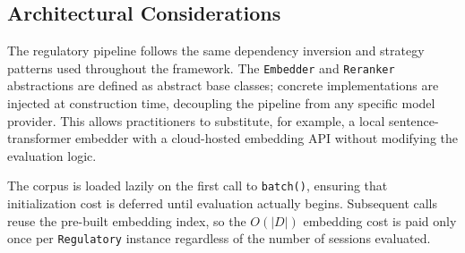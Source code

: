 \subsection{Architectural Considerations}

The regulatory pipeline follows the same dependency inversion and strategy patterns used throughout the framework. The \texttt{Embedder} and \texttt{Reranker} abstractions are defined as abstract base classes; concrete implementations are injected at construction time, decoupling the pipeline from any specific model provider. This allows practitioners to substitute, for example, a local sentence-transformer embedder with a cloud-hosted embedding API without modifying the evaluation logic.

The corpus is loaded lazily on the first call to \texttt{batch()}, ensuring that initialization cost is deferred until evaluation actually begins. Subsequent calls reuse the pre-built embedding index, so the $O(|D|)$ embedding cost is paid only once per \texttt{Regulatory} instance regardless of the number of sessions evaluated.
